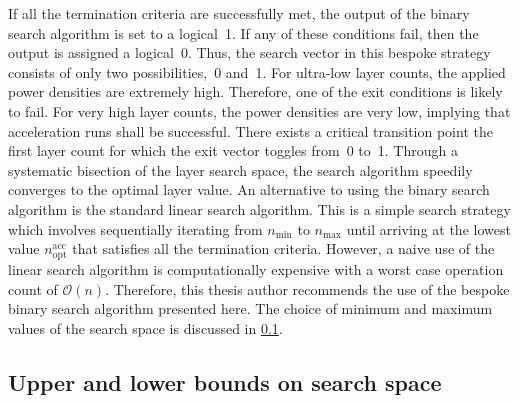 If all the  termination criteria are successfully met, the  output of the binary
search algorithm is  set to a logical~1.  If any of these  conditions fail, then
the output  is assigned  a logical~0.  Thus, the search  vector in  this bespoke
strategy  consists  of only  two  possibilities,~0  and~1. For  ultra-low  layer
counts, the  applied power densities are  extremely high. Therefore, one  of the
exit  conditions is  likely  to fail.  For  very high  layer  counts, the  power
densities are  very low,  implying that acceleration  runs shall  be successful.
There exists a critical transition point  \viz{} the first layer count for which
the exit vector toggles from~0 to~1. Through a systematic bisection of the layer
search  space, the  search algorithm  speedily  converges to  the optimal  layer
value.  An alternative  to using  the binary  search algorithm  is the  standard
linear  search  algorithm. This  is  a  simple  search strategy  which  involves
sequentially iterating  from $n_\text{min}$ to $n_\text{max}$  until arriving at
the lowest  value $n_\text{opt}^\text{acc}$  that satisfies all  the termination
criteria. However, a naive use of the linear search algorithm is computationally
expensive with a worst case operation count of $\mathcal{O}(n)$. Therefore, this
thesis  author  recommends  the  use  of the  bespoke  binary  search  algorithm
presented here. The choice of minimum and  maximum values of the search space is
discussed in \cref{sec:layersearchbounds}.

\subsection{Upper and lower bounds on search space}\label{sec:layersearchbounds}


